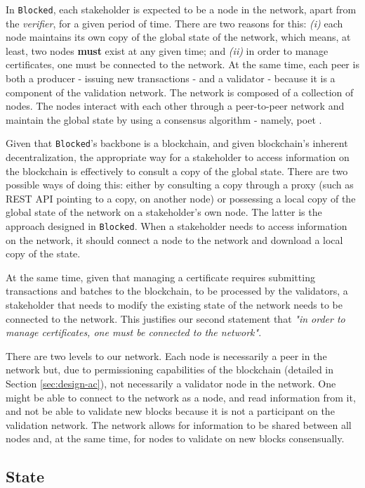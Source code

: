 In \texttt{Blocked}, each stakeholder is expected to be a node in the network, apart from the \textit{verifier}, for a given period of time. There are two reasons for this: \emph{(i)} each node maintains its own copy of the global state of the network, which means, at least, two nodes \textbf{must} exist at any given time; and \emph{(ii)} in order to manage certificates, one must be connected to the network. At the same time, each peer is both a producer - issuing new transactions - and a validator - because it is a component of the validation network. The network is composed of a collection of nodes. The nodes interact with each other through a peer-to-peer network and maintain the global state by using a consensus algorithm - namely, \gls{poet} \cite{intel_poet}.

Given that \texttt{Blocked}'s backbone is a blockchain, and given blockchain's inherent decentralization, the appropriate way for a stakeholder to access information on the blockchain is effectively to consult a copy of the global state. There are two possible ways of doing this: either by consulting a copy through a proxy (such as REST API pointing to a copy, on another node) or possessing a local copy of the global state of the network on a stakeholder's own node. The latter is the approach designed in \texttt{Blocked}. When a stakeholder needs to access information on the network, it should connect a node to the network and download a local copy of the state.

At the same time, given that managing a certificate requires submitting transactions and batches to the blockchain, to be processed by the validators, a stakeholder that needs to modify the existing state of the network needs to be connected to the network. This justifies our second statement that \emph{"in order to manage certificates, one must be connected to the network"}.

There are two levels to our network. Each node is necessarily a peer in the network but, due to permissioning capabilities of the blockchain (detailed in Section \ref{sec:design-ac}), not necessarily a validator node in the network. One might be able to connect to the network as a node, and read information from it, and not be able to validate new blocks because it is not a participant on the validation network. The network allows for information to be shared between all nodes and, at the same time, for nodes to validate on new blocks consensually.

\subsection{State}
\label{sec:design-state}

